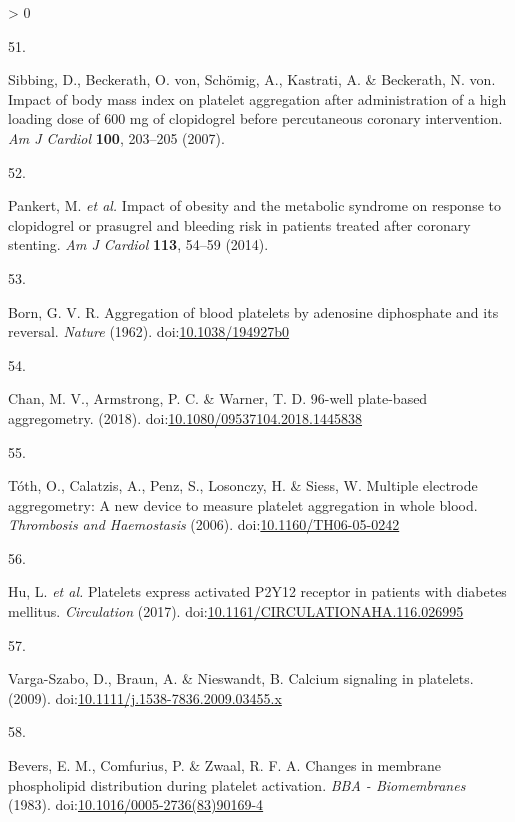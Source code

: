 \documentclass[11pt,twoside]{bristolthesis}
\newlength{\cslhangindent}
\newlength{\csllabelwidth}
\newenvironment{CSLReferences}[2] %
 {%
  \setlength{\parindent}{0pt}
  \ifodd #1 \everypar{\setlength{\hangindent}{\cslhangindent}}\ignorespaces\fi
  \ifnum #2 > 0
  \setlength{\parskip}{#2\baselineskip}
  \fi
 }%
 {}
\newcommand{\CSLLeftMargin}[1]{\parbox[t]{\csllabelwidth}{#1}}
\newcommand{\CSLRightInline}[1]{\parbox[t]{\linewidth - \csllabelwidth}{#1}\break}
\begin{document}
\begin{CSLReferences}{0}{0}
\leavevmode\hypertarget{ref-Sibbing2007}{}%
\CSLLeftMargin{51. }
\CSLRightInline{Sibbing, D., Beckerath, O. von, Schömig, A., Kastrati, A. \& Beckerath, N. von. {Impact of body mass index on platelet aggregation after administration of a high loading dose of 600 mg of clopidogrel before percutaneous coronary intervention}. \emph{Am J Cardiol} \textbf{100}, 203--205 (2007).}

\leavevmode\hypertarget{ref-Pankert2014}{}%
\CSLLeftMargin{52. }
\CSLRightInline{Pankert, M. \emph{et al.} {Impact of obesity and the metabolic syndrome on response to clopidogrel or prasugrel and bleeding risk in patients treated after coronary stenting}. \emph{Am J Cardiol} \textbf{113}, 54--59 (2014).}

\leavevmode\hypertarget{ref-Born1962}{}%
\CSLLeftMargin{53. }
\CSLRightInline{Born, G. V. R. {Aggregation of blood platelets by adenosine diphosphate and its reversal}. \emph{Nature} (1962). doi:\href{https://doi.org/10.1038/194927b0}{10.1038/194927b0}}

\leavevmode\hypertarget{ref-Chan2018}{}%
\CSLLeftMargin{54. }
\CSLRightInline{Chan, M. V., Armstrong, P. C. \& Warner, T. D. 96-well plate-based aggregometry. (2018). doi:\href{https://doi.org/10.1080/09537104.2018.1445838}{10.1080/09537104.2018.1445838}}

\leavevmode\hypertarget{ref-Toth2006}{}%
\CSLLeftMargin{55. }
\CSLRightInline{Tóth, O., Calatzis, A., Penz, S., Losonczy, H. \& Siess, W. {Multiple electrode aggregometry: A new device to measure platelet aggregation in whole blood}. \emph{Thrombosis and Haemostasis} (2006). doi:\href{https://doi.org/10.1160/TH06-05-0242}{10.1160/TH06-05-0242}}

\leavevmode\hypertarget{ref-Hu2017}{}%
\CSLLeftMargin{56. }
\CSLRightInline{Hu, L. \emph{et al.} {Platelets express activated P2Y12 receptor in patients with diabetes mellitus}. \emph{Circulation} (2017). doi:\href{https://doi.org/10.1161/CIRCULATIONAHA.116.026995}{10.1161/CIRCULATIONAHA.116.026995}}

\leavevmode\hypertarget{ref-Varga-Szabo2009}{}%
\CSLLeftMargin{57. }
\CSLRightInline{Varga-Szabo, D., Braun, A. \& Nieswandt, B. {Calcium signaling in platelets}. (2009). doi:\href{https://doi.org/10.1111/j.1538-7836.2009.03455.x}{10.1111/j.1538-7836.2009.03455.x}}

\leavevmode\hypertarget{ref-Bevers1983}{}%
\CSLLeftMargin{58. }
\CSLRightInline{Bevers, E. M., Comfurius, P. \& Zwaal, R. F. A. {Changes in membrane phospholipid distribution during platelet activation}. \emph{BBA - Biomembranes} (1983). doi:\href{https://doi.org/10.1016/0005-2736(83)90169-4}{10.1016/0005-2736(83)90169-4}}


\end{CSLReferences}
\end{document}
